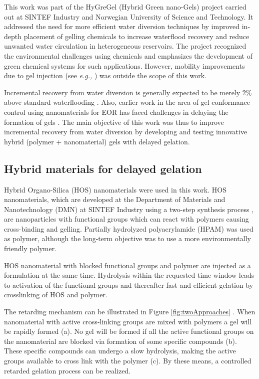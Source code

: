 \documentclass[energies,article,submit,moreauthors,pdftex]{Definitions/mdpi}
\begin{document}
This work was part of the HyGreGel (Hybrid Green nano-Gels) project carried out at SINTEF Industry and Norwegian University of Science and Technology. It addressed the need for more efficient water diversion techniques by improved in-depth placement of gelling chemicals to increase waterflood recovery and reduce unwanted water circulation in heterogeneous reservoirs. The project recognized the environmental challenges using chemicals and emphasizes the development of green chemical systems for such applications. However, mobility improvements due to gel injection (see \emph{e.g.,} \cite{Li2019}) was outside the scope of this work.  

Incremental recovery from water diversion is generally expected to be merely 2\% above standard waterflooding \citep{OG21}. Also, earlier work in the area of gel conformance control using nanomaterials for EOR has faced challenges in delaying the formation of gels \cite{Sydansk2000}. The main objective of this work was thus to improve incremental recovery from water diversion by developing and testing innovative hybrid (polymer + nanomaterial) gels with delayed gelation.

\subsection{Hybrid materials for delayed gelation}
Hybrid Organo-Silica (HOS) nanomaterials were used in this work. HOS nanomaterials, which are developed at  the  Department  of  Materials  and  Nanotechnology (DMN) at  SINTEF  Industry using a two-step synthesis process \citep{Mannle2011}, are nanoparticles with functional groups which can react with polymers causing cross-binding and gelling. Partially hydrolyzed polyacrylamide (HPAM)  was used as polymer, although the long-term objective was to use a more environmentally friendly polymer.

HOS nanomaterial with blocked functional groups and polymer are injected as a formulation at the same time. Hydrolysis within the requested time window leads to activation of the functional groups and thereafter fast and efficient gelation by crosslinking of HOS and polymer. 

The retarding mechanism can be illustrated in Figure \ref{fig:twoApproaches} \citep{Najafiazar2016}. When nanomaterial with active cross-linking groups are mixed with polymers a gel will be rapidly formed (a). No gel will be formed if all the active functional groups on the nanomaterial are blocked via formation of some specific compounds (b). These specific compounds can undergo a slow hydrolysis, making the active groups available to cross link with the polymer (c). By these means, a controlled retarded gelation process can be realized. 
\end{document}
